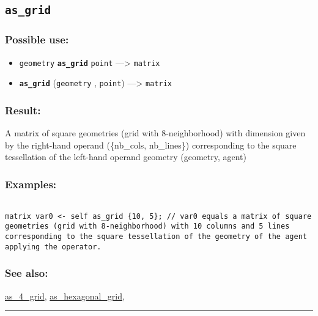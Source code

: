 \documentclass[]{book}
\providecommand{\tightlist}{%
  \setlength{\itemsep}{0pt}\setlength{\parskip}{0pt}}
\theoremstyle{definition}
\theoremstyle{definition}
\theoremstyle{definition}
\theoremstyle{remark}
\begin{document}
\subsection{\texorpdfstring{\texttt{as\_grid}}{as\_grid}}\label{as_grid}

\subsubsection{Possible use:}\label{possible-use-48}

\begin{itemize}
\tightlist
\item
  \texttt{geometry} \textbf{\texttt{as\_grid}} \texttt{point}
  ---\textgreater{} \texttt{matrix}
\item
  \textbf{\texttt{as\_grid}} (\texttt{geometry} , \texttt{point})
  ---\textgreater{} \texttt{matrix}
\end{itemize}

\subsubsection{Result:}\label{result-47}

A matrix of square geometries (grid with 8-neighborhood) with dimension
given by the right-hand operand (\{nb\_cols, nb\_lines\}) corresponding
to the square tessellation of the left-hand operand geometry (geometry,
agent)

\subsubsection{Examples:}\label{examples-39}

\begin{verbatim}
 
matrix var0 <- self as_grid {10, 5}; // var0 equals a matrix of square geometries (grid with 8-neighborhood) with 10 columns and 5 lines corresponding to the square tessellation of the geometry of the agent applying the operator.
\end{verbatim}

\subsubsection{See also:}\label{see-also-33}

\href{OperatorsAA\#as_4_grid}{as\_4\_grid},
\href{OperatorsAA\#as_hexagonal_grid}{as\_hexagonal\_grid},

\begin{center}\rule{0.5\linewidth}{\linethickness}\end{center}
\end{document}
